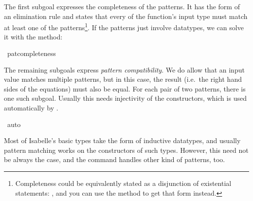 \begin{isabellebody}
\begin{isamarkuptxt}
  The first subgoal expresses the completeness of the patterns. It has
  the form of an elimination rule and states that every  of
  the function's input type must match at least one of the patterns\footnote{Completeness could
  be equivalently stated as a disjunction of existential statements: 
, and you can use the method  to get that form instead.}. If the patterns just involve
  datatypes, we can solve it with the 
  method:%
\end{isamarkuptxt}%
\isamarkuptrue%
\isamarkupfalse%
\ pat{}completeness%
\begin{isamarkuptxt}%
The remaining subgoals express \emph{pattern compatibility}. We do
  allow that an input value matches multiple patterns, but in this
  case, the result (i.e.~the right hand sides of the equations) must
  also be equal. For each pair of two patterns, there is one such
  subgoal. Usually this needs injectivity of the constructors, which
  is used automatically by .%
\end{isamarkuptxt}%
\isamarkuptrue%
\isamarkupfalse%
\ auto%
\endisatagproof
{\isafoldproof}%
%
\isadelimproof
%
\endisadelimproof
%
\isamarkuptrue%
%
\begin{isamarkuptext}%
Most of Isabelle's basic types take the form of inductive datatypes,
  and usually pattern matching works on the constructors of such types. 
  However, this need not be always the case, and the 
  command handles other kind of patterns, too.


\end{isamarkuptext}
\end{isabellebody}
